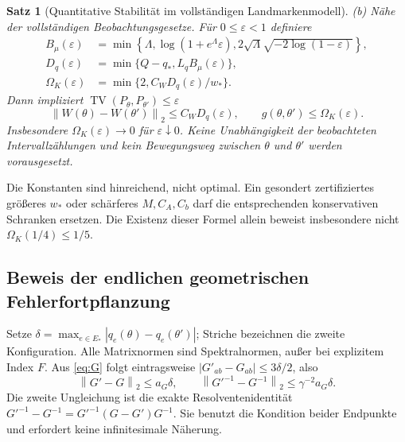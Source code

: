 \documentclass[11pt,a4paper]{article}
\newtheorem{theorem}{Satz}
\theoremstyle{definition}\newtheorem{definition}{Definition}
\theoremstyle{remark}\newtheorem*{remark}{Bemerkung}
\newcommand{\TV}{\operatorname{TV}}
\newcommand{\norm}[1]{\left\lVert#1\right\rVert}
\begin{document}
\begin{theorem}[Quantitative Stabilität im vollständigen Landmarkenmodell]
\textnormal{(b) Nähe der vollständigen Beobachtungsgesetze.} Für $0\leq\varepsilon<1$ definiere
\begin{align}
 B_\mu(\varepsilon)&=\min\left\{\Lambda,
      \log(1+e^\Lambda\varepsilon),
      2\sqrt\Lambda\sqrt{-2\log(1-\varepsilon)}\right\},\label{eq:Bmu}\\
 D_q(\varepsilon)&=\min\{Q-q_*,L_qB_\mu(\varepsilon)\},\\
 \Omega_K(\varepsilon)&=\min\{2,C_WD_q(\varepsilon)/w_*\}.\label{eq:explicitOmega}
\end{align}
Dann impliziert $\TV(P_\theta,P_{\theta'})\leq\varepsilon$
\begin{equation}\label{eq:mainbound}
 \norm{W(\theta)-W(\theta')}_2\leq C_WD_q(\varepsilon),
 \qquad g(\theta,\theta')\leq\Omega_K(\varepsilon).
\end{equation}
Insbesondere $\Omega_K(\varepsilon)\to0$ für $\varepsilon\downarrow0$. Keine Unabhängigkeit der beobachteten Intervallzählungen und kein Bewegungsweg zwischen $\theta$ und $\theta'$ werden vorausgesetzt.
\end{theorem}

Die Konstanten sind hinreichend, nicht optimal. Ein gesondert zertifiziertes größeres $w_*$ oder schärferes $M,C_A,C_b$ darf die entsprechenden konservativen Schranken ersetzen. Die Existenz dieser Formel allein beweist insbesondere nicht $\Omega_K(1/4)\leq1/5$.

\subsection{Beweis der endlichen geometrischen Fehlerfortpflanzung}

Setze $\delta=\max_{e\in E_*}|q_e(\theta)-q_e(\theta')|$; Striche bezeichnen die zweite Konfiguration. Alle Matrixnormen sind Spektralnormen, außer bei explizitem Index $F$.
Aus \eqref{eq:G} folgt eintragsweise $|G'_{ab}-G_{ab}|\leq3\delta/2$, also
\begin{equation}
 \norm{G'-G}_2\leq a_G\delta,\qquad
 \norm{G'^{-1}-G^{-1}}_2
 \leq\gamma^{-2}a_G\delta.\label{eq:resolvent}
\end{equation}
Die zweite Ungleichung ist die exakte Resolventenidentität
$G'^{-1}-G^{-1}=G'^{-1}(G-G')G^{-1}$. Sie benutzt die Kondition beider Endpunkte und erfordert keine infinitesimale Näherung.
\end{document}
